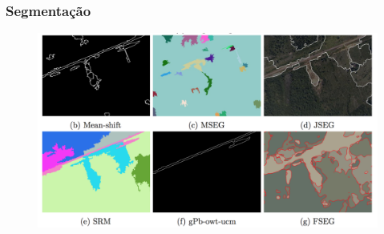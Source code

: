 \documentclass[t]{beamer}
\begin{document}
\begin{frame}[c]
	\frametitle{Segmentação}

	\begin{figure}[c]
		\centering
		\includegraphics[width=\textwidth]{imgs/gambi_apresentacao}
	\end{figure}

\end{frame}

%
%
%
\end{document}
